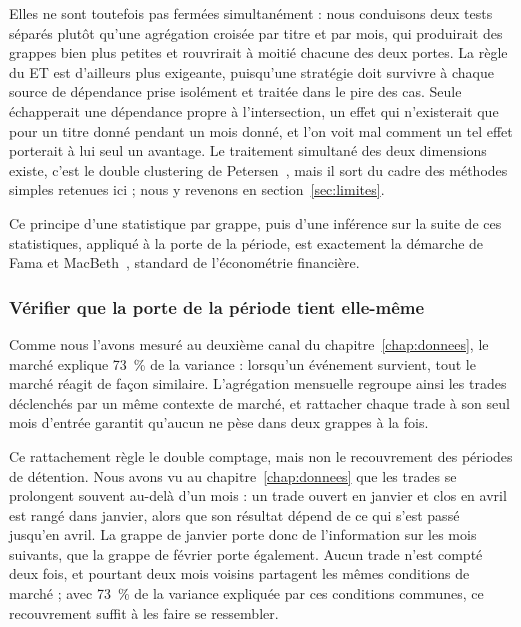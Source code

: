 Elles ne sont toutefois pas fermées simultanément : nous conduisons deux tests
séparés plutôt qu'une agrégation croisée par titre et par mois, qui produirait
des grappes bien plus petites et rouvrirait à moitié chacune des deux portes.
La règle du ET est d'ailleurs plus exigeante, puisqu'une stratégie doit
survivre à chaque source de dépendance prise isolément et traitée dans le pire
des cas. Seule échapperait une dépendance propre à l'intersection, un effet
qui n'existerait que pour un titre donné pendant un mois donné, et l'on voit
mal comment un tel effet porterait à lui seul un avantage. Le traitement
simultané des deux dimensions existe, c'est le double clustering de
Petersen~\cite{petersen2009}, mais il sort du cadre des méthodes simples
retenues ici ; nous y revenons en section~\ref{sec:limites}.

Ce principe d'une statistique par grappe, puis d'une inférence sur la suite de
ces statistiques, appliqué à la porte de la période, est exactement la démarche
de Fama et MacBeth~\cite{famamacbeth1973}, standard de l'économétrie financière.



\subsubsection*{Vérifier que la porte de la période tient elle-même}

Comme nous l'avons mesuré au deuxième canal du chapitre~\ref{chap:donnees}, le
marché explique 73~\% de la variance : lorsqu'un événement survient, tout le
marché réagit de façon similaire. L'agrégation mensuelle regroupe ainsi les
trades déclenchés par un même contexte de marché, et rattacher chaque trade à
son seul mois d'entrée garantit qu'aucun ne pèse dans deux grappes à la fois.

Ce rattachement règle le double comptage, mais non le recouvrement des périodes
de détention. Nous avons vu au chapitre~\ref{chap:donnees} que les trades se
prolongent souvent au-delà d'un mois : un trade ouvert en janvier et clos en
avril est rangé dans janvier, alors que son résultat dépend de ce qui s'est
passé jusqu'en avril. La grappe de janvier porte donc de l'information sur les
mois suivants, que la grappe de février porte également. Aucun trade n'est
compté deux fois, et pourtant deux mois voisins partagent les mêmes conditions
de marché ; avec 73~\% de la variance expliquée par ces conditions communes, ce
recouvrement suffit à les faire se ressembler.

